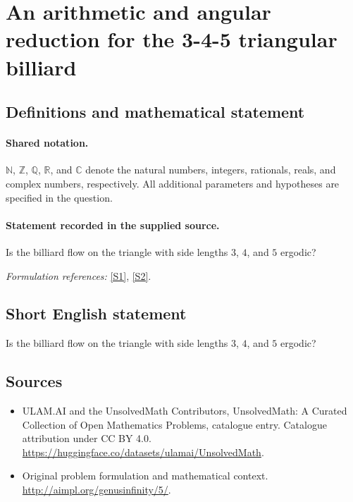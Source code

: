 \documentclass[11pt]{article}
\newcommand{\sref}[2]{\hyperlink{source:#1:#2}{[S#2]}}
\begin{document}
\section{An arithmetic and angular reduction for the 3-4-5 triangular billiard}\label{statement}

\subsection{Definitions and mathematical statement}

\paragraph{Shared notation.}$\mathbb N$, $\mathbb Z$, $\mathbb Q$, $\mathbb R$, and $\mathbb C$ denote the natural numbers, integers, rationals, reals, and complex numbers, respectively. All additional parameters and hypotheses are specified in the question.


\paragraph{Statement recorded in the supplied source.}
Is the billiard flow on the triangle with side lengths $3$, $4$, and $5$ ergodic?
\par\smallskip\textit{Formulation references:} \sref{statement}{1}, \sref{statement}{2}.
\subsection{Short English statement}
Is the billiard flow on the triangle with side lengths $3$, $4$, and $5$ ergodic?
\subsection{Sources}
\begin{itemize}
\item[\hypertarget{source:statement:1}{S1}] ULAM.AI and the UnsolvedMath Contributors, UnsolvedMath: A Curated Collection of Open Mathematics Problems, catalogue entry. Catalogue attribution under CC BY 4.0.
\url{https://huggingface.co/datasets/ulamai/UnsolvedMath}.
\item[\hypertarget{source:statement:2}{S2}] Original problem formulation and mathematical context.
\url{http://aimpl.org/genusinfinity/5/}.
\end{itemize}
\label{end:statement}
\end{document}
